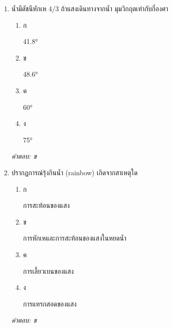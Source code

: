 \documentclass[12pt]{article}
\begin{document}
\begin{enumerate}[label=\arabic*., itemsep=0.5\baselineskip, topsep=0.5\baselineskip, leftmargin=*]
\item น้ำมีดัชนีหักเห 4/3 ถ้าแสงเดินทางจากน้ำ มุมวิกฤตเท่ากับกี่องศา
\begin{enumerate}[label=\alph*)., itemsep=0.3\baselineskip, topsep=0.3\baselineskip]
\item ก\ 
\begin{minipage}[t]{0.9\linewidth}
\raggedright 41.8°
\end{minipage}
\item ข\ 
\begin{minipage}[t]{0.9\linewidth}
\raggedright 48.6°
\end{minipage}
\item ค\ 
\begin{minipage}[t]{0.9\linewidth}
\raggedright 60°
\end{minipage}
\item ง\ 
\begin{minipage}[t]{0.9\linewidth}
\raggedright 75°
\end{minipage}
\end{enumerate}
\vspace{-0.3\baselineskip}
\begin{small}
\textit{คำตอบ: ข}
\end{small}

\item ปรากฏการณ์รุ้งกินน้ำ (rainbow) เกิดจากสาเหตุใด
\begin{enumerate}[label=\alph*)., itemsep=0.3\baselineskip, topsep=0.3\baselineskip]
\item ก\ 
\begin{minipage}[t]{0.9\linewidth}
\raggedright การสะท้อนของแสง
\end{minipage}
\item ข\ 
\begin{minipage}[t]{0.9\linewidth}
\raggedright การหักเหและการสะท้อนของแสงในหยดน้ำ
\end{minipage}
\item ค\ 
\begin{minipage}[t]{0.9\linewidth}
\raggedright การเลี้ยวเบนของแสง
\end{minipage}
\item ง\ 
\begin{minipage}[t]{0.9\linewidth}
\raggedright การแทรกสอดของแสง
\end{minipage}
\end{enumerate}
\vspace{-0.3\baselineskip}
\begin{small}
\textit{คำตอบ: ข}
\end{small}


\end{enumerate}
\end{document}
